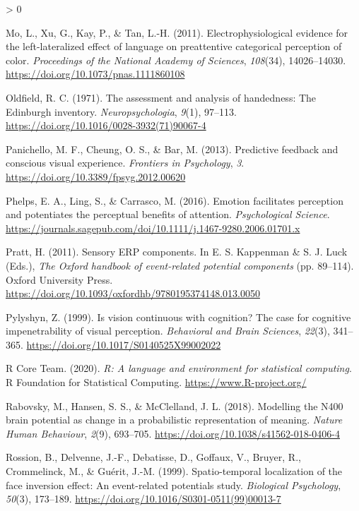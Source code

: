 \documentclass[
  english,
  doc,12pt,twoside,floatsintext]{apa7}
\newlength{\cslhangindent}
\newenvironment{CSLReferences}[2] %
 {%
  \setlength{\parindent}{0pt}
  \ifodd #1 \everypar{\setlength{\hangindent}{\cslhangindent}}\ignorespaces\fi
  \ifnum #2 > 0
  \setlength{\parskip}{#2\baselineskip}
  \fi
 }%
 {}
\begin{document}
\begin{CSLReferences}{1}{0}
\leavevmode\hypertarget{ref-mo2011}{}%
Mo, L., Xu, G., Kay, P., \& Tan, L.-H. (2011). Electrophysiological evidence for the left-lateralized effect of language on preattentive categorical perception of color. \emph{Proceedings of the National Academy of Sciences}, \emph{108}(34), 14026--14030. \url{https://doi.org/10.1073/pnas.1111860108}

\leavevmode\hypertarget{ref-oldfield1971}{}%
Oldfield, R. C. (1971). The assessment and analysis of handedness: The {Edinburgh} inventory. \emph{Neuropsychologia}, \emph{9}(1), 97--113. \url{https://doi.org/10.1016/0028-3932(71)90067-4}

\leavevmode\hypertarget{ref-panichello2013}{}%
Panichello, M. F., Cheung, O. S., \& Bar, M. (2013). Predictive feedback and conscious visual experience. \emph{Frontiers in Psychology}, \emph{3}. \url{https://doi.org/10.3389/fpsyg.2012.00620}

\leavevmode\hypertarget{ref-phelps2016}{}%
Phelps, E. A., Ling, S., \& Carrasco, M. (2016). Emotion facilitates perception and potentiates the perceptual benefits of attention. \emph{Psychological Science}. \url{https://journals.sagepub.com/doi/10.1111/j.1467-9280.2006.01701.x}

\leavevmode\hypertarget{ref-pratt2011}{}%
Pratt, H. (2011). Sensory ERP components. In E. S. Kappenman \& S. J. Luck (Eds.), \emph{The {Oxford handbook} of event-related potential components} (pp. 89--114). Oxford University Press. \url{https://doi.org/10.1093/oxfordhb/9780195374148.013.0050}

\leavevmode\hypertarget{ref-pylyshyn1999}{}%
Pylyshyn, Z. (1999). Is vision continuous with cognition? The case for cognitive impenetrability of visual perception. \emph{Behavioral and Brain Sciences}, \emph{22}(3), 341--365. \url{https://doi.org/10.1017/S0140525X99002022}

\leavevmode\hypertarget{ref-R-base}{}%
R Core Team. (2020). \emph{R: A language and environment for statistical computing}. R Foundation for Statistical Computing. \url{https://www.R-project.org/}

\leavevmode\hypertarget{ref-rabovsky2018}{}%
Rabovsky, M., Hansen, S. S., \& McClelland, J. L. (2018). Modelling the {N400} brain potential as change in a probabilistic representation of meaning. \emph{Nature Human Behaviour}, \emph{2}(9), 693--705. \url{https://doi.org/10.1038/s41562-018-0406-4}

\leavevmode\hypertarget{ref-rossion1999}{}%
Rossion, B., Delvenne, J.-F., Debatisse, D., Goffaux, V., Bruyer, R., Crommelinck, M., \& Guérit, J.-M. (1999). Spatio-temporal localization of the face inversion effect: An event-related potentials study. \emph{Biological Psychology}, \emph{50}(3), 173--189. \url{https://doi.org/10.1016/S0301-0511(99)00013-7}


\end{CSLReferences}
\end{document}

